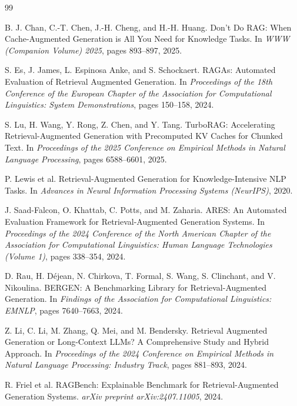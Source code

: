 \documentclass[12pt,a4paper]{article}
\begin{document}

\begin{thebibliography}{99}

B. J. Chan, C.-T. Chen, J.-H. Cheng, and H.-H. Huang. Don't Do RAG: When Cache-Augmented Generation is All You Need for Knowledge Tasks. In \textit{WWW (Companion Volume) 2025}, pages 893--897, 2025.

S. Es, J. James, L. Espinosa Anke, and S. Schockaert. RAGAs: Automated Evaluation of Retrieval Augmented Generation. In \textit{Proceedings of the 18th Conference of the European Chapter of the Association for Computational Linguistics: System Demonstrations}, pages 150--158, 2024.

S. Lu, H. Wang, Y. Rong, Z. Chen, and Y. Tang. TurboRAG: Accelerating Retrieval-Augmented Generation with Precomputed KV Caches for Chunked Text. In \textit{Proceedings of the 2025 Conference on Empirical Methods in Natural Language Processing}, pages 6588--6601, 2025.

P. Lewis et al. Retrieval-Augmented Generation for Knowledge-Intensive NLP Tasks. In \textit{Advances in Neural Information Processing Systems (NeurIPS)}, 2020.

J. Saad-Falcon, O. Khattab, C. Potts, and M. Zaharia. ARES: An Automated Evaluation Framework for Retrieval-Augmented Generation Systems. In \textit{Proceedings of the 2024 Conference of the North American Chapter of the Association for Computational Linguistics: Human Language Technologies (Volume 1)}, pages 338--354, 2024.

D. Rau, H. D{\'e}jean, N. Chirkova, T. Formal, S. Wang, S. Clinchant, and V. Nikoulina. BERGEN: A Benchmarking Library for Retrieval-Augmented Generation. In \textit{Findings of the Association for Computational Linguistics: EMNLP}, pages 7640--7663, 2024.

Z. Li, C. Li, M. Zhang, Q. Mei, and M. Bendersky. Retrieval Augmented Generation or Long-Context LLMs? A Comprehensive Study and Hybrid Approach. In \textit{Proceedings of the 2024 Conference on Empirical Methods in Natural Language Processing: Industry Track}, pages 881--893, 2024.

R. Friel et al. RAGBench: Explainable Benchmark for Retrieval-Augmented Generation Systems. \textit{arXiv preprint arXiv:2407.11005}, 2024.


\end{thebibliography}
\end{document}
